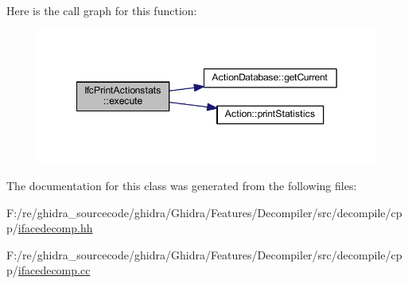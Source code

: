 Here is the call graph for this function\+:
\nopagebreak
\begin{figure}[H]
\begin{center}
\leavevmode
\includegraphics[width=349pt]{class_ifc_print_actionstats_a46e637cead1a46f203fa2c1571f0b955_cgraph}
\end{center}
\end{figure}


The documentation for this class was generated from the following files\+:\begin{DoxyCompactItemize}
\item 
F\+:/re/ghidra\+\_\+sourcecode/ghidra/\+Ghidra/\+Features/\+Decompiler/src/decompile/cpp/\mbox{\hyperlink{ifacedecomp_8hh}{ifacedecomp.\+hh}}\item 
F\+:/re/ghidra\+\_\+sourcecode/ghidra/\+Ghidra/\+Features/\+Decompiler/src/decompile/cpp/\mbox{\hyperlink{ifacedecomp_8cc}{ifacedecomp.\+cc}}\end{DoxyCompactItemize}
